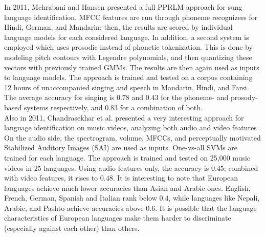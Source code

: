 In 2011, Mehrabani and Hansen presented a full PPRLM approach for sung language identification. MFCC features are run through phoneme recognizers for Hindi, German, and Mandarin; then, the results are scored by individual language models for each considered language. In addition, a second system is employed which uses prosodic instead of phonetic tokenization. This is done by modeling pitch contours with Legendre polynomials, and then quantizing these vectors with previously trained GMMs. The results are then again used as inputs to language models.
The approach is trained and tested on a corpus containing 12 hours of unaccompanied singing and speech in Mandarin, Hindi, and Farsi. The average accuracy for singing is $0.78$ and $0.43$ for the phoneme- and prosody-based systems respectively, and $0.83$ for a combination of both.\\

Also in 2011, Chandrasekhar et al. presented a very interesting approach for language identification on music videos, analyzing both audio and video features \cite {chandrasekhar}. On the audio side, the spectrogram, volume, MFCCs, and perceptually motivated Stabilized Auditory Images (SAI) are used as inputs. One-vs-all SVMs are trained for each language. The approach is trained and tested on 25,000 music videos in 25 languages. Using audio features only, the accuracy is $0.45$; combined with video features, it rises to $0.48$. It is interesting to note that European languages achieve much lower accuracies than Asian and Arabic ones. English, French, German, Spanish and Italian rank below $0.4$, while languages like Nepali, Arabic, and Pashto achieve accuracies above $0.6$. It is possible that the language characteristics of European languages make them harder to discriminate (especially against each other) than others.

